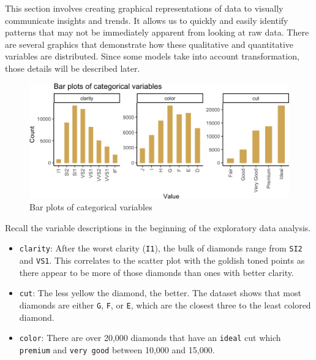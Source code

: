 \documentclass[
  paper=a4,
  ,captions=tableheading
]{scrartcl}
\begin{document}
This section involves creating graphical representations of data to
visually communicate insights and trends. It allows us to quickly and
easily identify patterns that may not be immediately apparent from
looking at raw data. There are several graphics that demonstrate how
these qualitative and quantitative variables are distributed. Since some
models take into account transformation, those details will be described
later.

\begin{figure}[H]

{\centering \includegraphics[width=\linewidth,]{Diamonds_PDF_files/figure-latex/categorical bar plots-1}

}

\caption{Bar plots of categorical variables}\label{fig:categorical bar plots}
\end{figure}

Recall the variable descriptions in the beginning of the exploratory
data analysis.

\begin{itemize}
\item
  \texttt{clarity}: After the worst clarity (\texttt{I1}), the bulk of
  diamonds range from \texttt{SI2} and \texttt{VS1}. This correlates to
  the scatter plot with the goldish toned points as there appear to be
  more of those diamonds than ones with better clarity.
\item
  \texttt{cut}: The less yellow the diamond, the better. The dataset
  shows that most diamonds are either \texttt{G}, \texttt{F}, or
  \texttt{E}, which are the closest three to the least colored diamond.
\item
  \texttt{color}: There are over 20,000 diamonds that have an
  \texttt{ideal} cut which \texttt{premium} and \texttt{very\ good}
  between 10,000 and 15,000.
\end{itemize}
\end{document}
